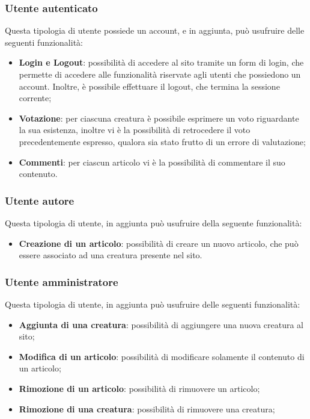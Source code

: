 \subsubsection{Utente autenticato}
Questa tipologia di utente possiede un account, e in aggiunta, può usufruire delle seguenti funzionalità:
\begin{itemize}
    \item \textbf{Login e Logout}: possibilità di accedere al sito tramite un form di login, che permette di accedere alle funzionalità riservate agli utenti che possiedono un account. Inoltre, è possibile effettuare il logout, che termina la sessione corrente;
    \item \textbf{Votazione}: per ciascuna creatura è possibile esprimere un voto riguardante la sua esistenza, inoltre vi è la possibilità di retrocedere il voto precedentemente espresso, qualora sia stato frutto di un errore di valutazione;
    \item \textbf{Commenti}: per ciascun articolo vi è la possibilità di commentare il suo contenuto.
\end{itemize}

\subsubsection{Utente autore}
Questa tipologia di utente, in aggiunta può usufruire della seguente funzionalità:
\begin{itemize}
    \item \textbf{Creazione di un articolo}: possibilità di creare un nuovo articolo, che può essere associato ad una creatura presente nel sito.
\end{itemize}

\subsubsection{Utente amministratore}
Questa tipologia di utente, in aggiunta può usufruire delle seguenti funzionalità:
\begin{itemize}
    \item \textbf{Aggiunta di una creatura}: possibilità di aggiungere una nuova creatura al sito;
    \item \textbf{Modifica di un articolo}: possibilità di modificare solamente il contenuto di un articolo;
    \item \textbf{Rimozione di un articolo}: possibilità di rimuovere un articolo;
    \item \textbf{Rimozione di una creatura}: possibilità di rimuovere una creatura;
\end{itemize}

